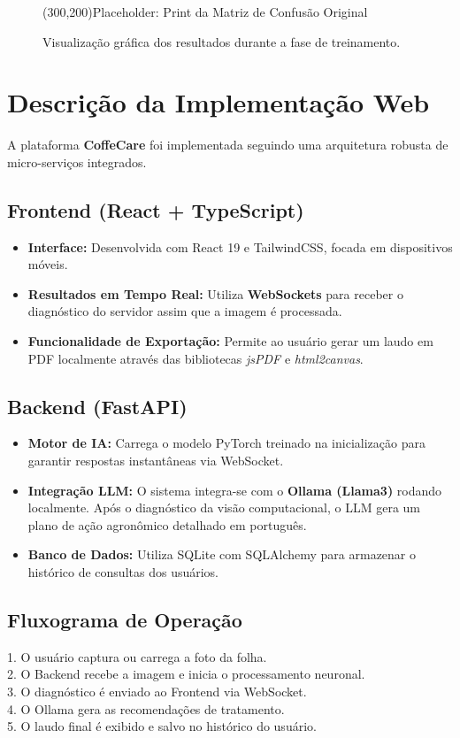 \documentclass[12pt,a4paper]{article}
\begin{document}
\begin{figure}[h!]
    \centering
    \color{gray}
    \framebox(300,200){Placeholder: Print da Matriz de Confusão Original}
    \caption{Visualização gráfica dos resultados durante a fase de treinamento.}
\end{figure}

\newpage

\section{Descrição da Implementação Web}

A plataforma \textbf{CoffeCare} foi implementada seguindo uma arquitetura robusta de micro-serviços integrados.

\subsection{Frontend (React + TypeScript)}
\begin{itemize}
    \item \textbf{Interface:} Desenvolvida com React 19 e TailwindCSS, focada em dispositivos móveis.
    \item \textbf{Resultados em Tempo Real:} Utiliza \textbf{WebSockets} para receber o diagnóstico do servidor assim que a imagem é processada.
    \item \textbf{Funcionalidade de Exportação:} Permite ao usuário gerar um laudo em PDF localmente através das bibliotecas \textit{jsPDF} e \textit{html2canvas}.
\end{itemize}

\subsection{Backend (FastAPI)}
\begin{itemize}
    \item \textbf{Motor de IA:} Carrega o modelo PyTorch treinado na inicialização para garantir respostas instantâneas via WebSocket.
    \item \textbf{Integração LLM:} O sistema integra-se com o \textbf{Ollama (Llama3)} rodando localmente. Após o diagnóstico da visão computacional, o LLM gera um plano de ação agronômico detalhado em português.
    \item \textbf{Banco de Dados:} Utiliza SQLite com SQLAlchemy para armazenar o histórico de consultas dos usuários.
\end{itemize}

\subsection{Fluxograma de Operação}
1. O usuário captura ou carrega a foto da folha. \\
2. O Backend recebe a imagem e inicia o processamento neuronal. \\
3. O diagnóstico é enviado ao Frontend via WebSocket. \\
4. O Ollama gera as recomendações de tratamento. \\
5. O laudo final é exibido e salvo no histórico do usuário.
\end{document}
